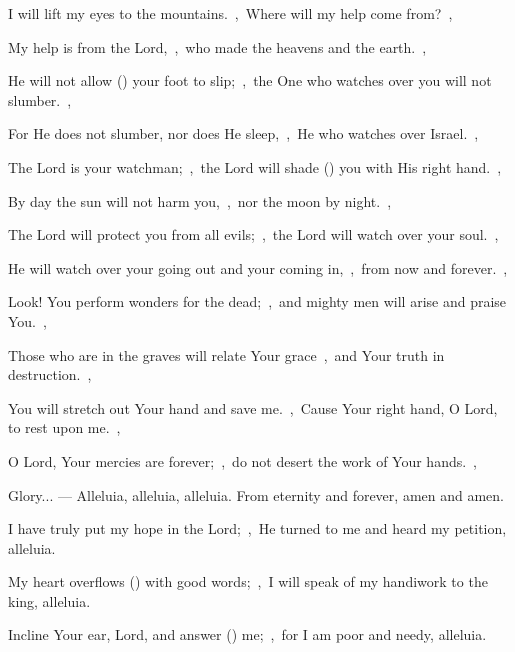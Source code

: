 \documentclass[12pt,twoside,a5paper]{article}
\begin{document}
\begin{halfparskip}
  I will lift my eyes to the mountains.~\sep\ Where will my help come from?~\sep

  My help is from the Lord,~\sep\ who made the heavens and the earth.~\sep

  He will not allow () your foot to slip;~\sep\ the One who watches over you will not slumber.~\sep

  For He does not slumber, nor does He sleep,~\sep\ He who watches over Israel.~\sep

  The Lord is your watchman;~\sep\ the Lord will shade () you with His right hand.~\sep

  By day the sun will not harm you,~\sep\ nor the moon by night.~\sep

  The Lord will protect you from all evils;~\sep\ the Lord will watch over your soul.~\sep

  He will watch over your going out and your coming in,~\sep\ from now and forever.~\sep
\end{halfparskip}

\begin{halfparskip}
   Look! You perform wonders for the dead;~\sep\ and mighty men will arise and praise You.~\sep

  Those who are in the graves will relate Your grace~\sep\ and Your truth in destruction.~\sep
\end{halfparskip}

\begin{halfparskip}
   You will stretch out Your hand and save me.~\sep\ Cause Your right hand, O Lord, to rest upon me.~\sep

  O Lord, Your mercies are forever;~\sep\ do not desert the work of Your hands.~\sep
\end{halfparskip}

Glory... --- Alleluia, alleluia, alleluia. From eternity and forever, amen and amen.


 I have truly put my hope in the Lord;~\sep\ He turned to me and heard my petition, alleluia.

 My heart overflows () with good words;~\sep\ I will speak of my handiwork to the king, alleluia.

 Incline Your ear, Lord, and answer () me;~\sep\ for I am poor and needy, alleluia.
\end{document}
